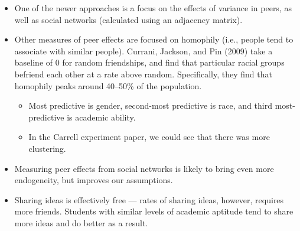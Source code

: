 \documentclass[10pt]{extarticle}
\begin{document}
\begin{itemize}
\begin{itemize}
      \end{itemize}
    \item One of the newer approaches is a focus on the effects of variance in peers, as well as social networks (calculated using an adjacency matrix).
    \item Other measures of peer effects are focused on homophily (i.e., people tend to associate with similar people). Currani, Jackson, and Pin (2009) take a baseline of $0$ for random friendships, and find that particular racial groups befriend each other at a rate above random. Specifically, they find that homophily peaks around 40--50\% of the population.
      \begin{itemize}
        \item Most predictive is gender, second-most predictive is race, and third most-predictive is academic ability.
        \item In the Carrell experiment paper, we could see that there was more clustering. 
      \end{itemize}
    \item Measuring peer effects from social networks is likely to bring even more endogeneity, but improves our assumptions.
    \item Sharing ideas is effectively free --- rates of sharing ideas, however, requires more friends. Students with similar levels of academic aptitude tend to share more ideas and do better as a result. 
  \end{itemize}
\end{document}
